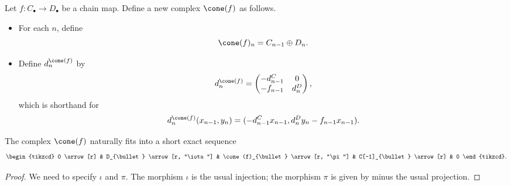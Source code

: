 \documentclass[main.tex]{subfiles}
\begin{document}
\begin{definition}
  \label{def:mapping_cone}
  Let $f\colon C_{\bullet} \to D_{\bullet}$ be a chain map. Define a new complex $\cone(f)$ as follows.
  \begin{itemize}
    \item For each $n$, define
      \begin{equation*}
        \cone(f)_{n} = C_{n-1} \oplus D_{n}.
      \end{equation*}

    \item Define $d^{\cone(f)}_{n}$ by
      \begin{equation*}
        d^{\cone(f)}_{n} =
        \begin{pmatrix}
          -d^{C}_{n-1} & 0 \\
          -f_{n-1} & d^{D}_{n}
        \end{pmatrix},
      \end{equation*}
      which is shorthand for
      \begin{equation*}
        d^{\cone(f)}_{n}(x_{n-1}, y_{n}) = (-d^{C}_{n-1}x_{n-1}, d^{D}_{n}y_{n} - f_{n-1}x_{n-1}).
      \end{equation*}
  \end{itemize}
\end{definition}

\begin{lemma}
  \label{lemma:cone_fits_into_ses}
  The complex $\cone(f)$ naturally fits into a short exact sequence
  \begin{equation*}
    \begin{tikzcd}
      0
      \arrow[r]
      & D_{\bullet}
      \arrow[r, "\iota"]
      & \cone(f)_{\bullet}
      \arrow[r, "\pi"]
      & C[-1]_{\bullet}
      \arrow[r]
      & 0
    \end{tikzcd}.
  \end{equation*}
\end{lemma}
\begin{proof}
  We need to specify $\iota$ and $\pi$. The morphism $\iota$ is the usual injection; the morphism $\pi$ is given by minus the usual projection.
\end{proof}
\end{document}
